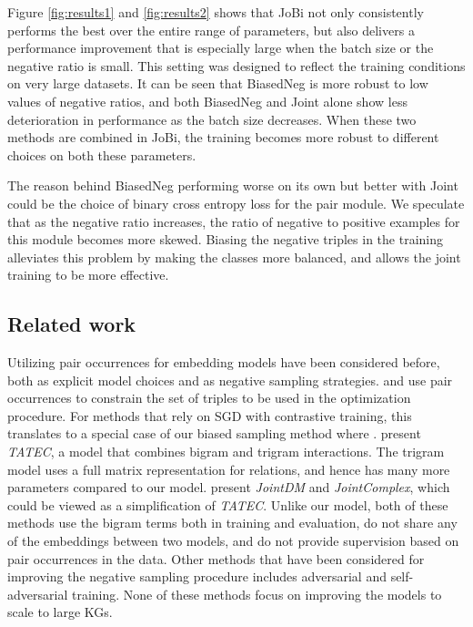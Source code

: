 \documentclass[11pt,a4paper, dvipsnames]{article}
\begin{document}
Figure \ref{fig:results1} and \ref{fig:results2} shows that JoBi not only consistently performs the best over the entire range of parameters, but also delivers a performance improvement that is especially large when the batch size or the negative ratio is small. This setting was designed to reflect the training conditions on very large datasets. It can be seen that BiasedNeg is more robust to low values of negative ratios, and both BiasedNeg and Joint alone show less deterioration in performance as the batch size decreases. When these two methods are combined in JoBi, the training becomes more robust to different choices on both these parameters.

The reason behind BiasedNeg performing worse on its own but better with Joint could be the choice of binary cross entropy loss for the pair module. 
We speculate that as the negative ratio increases, the ratio of negative to positive examples for this module becomes more skewed. Biasing the negative triples in the training alleviates this problem by making the classes more balanced, and allows the joint training to be more effective.

 \subsection{Related work} Utilizing pair occurrences for embedding models have been considered before, both as explicit model choices and as negative sampling strategies. \citet{chang2014typed} and \citet{Krompa2015Type-constrainedGraphs} use pair occurrences to constrain the set of triples to be used in the optimization procedure.
 For methods that rely on SGD with contrastive training, this translates to a special case of our biased sampling method where .  
 \citet{Garcia-Duran2016CombiningBases} present \textit{TATEC}, a model that combines bigram and trigram interactions. 
The trigram model uses a full matrix representation for relations, and hence has many more parameters compared to our model. \citet{Jain2018Type-SensitiveSupervision} present \textit{JointDM} and \textit{JointComplex}, which could be viewed as a simplification of \textit{TATEC}.
Unlike our model, both of these methods use the bigram terms both in training and evaluation, do not share any of the embeddings between two models, and do not provide supervision based on pair occurrences in the data. Other methods that have been considered for improving the negative sampling procedure includes adversarial \citep{cai2018kbgan} and self-adversarial \citep{sun2018rotate} training. None of these methods focus on improving the models to scale to large KGs. 
\end{document}
